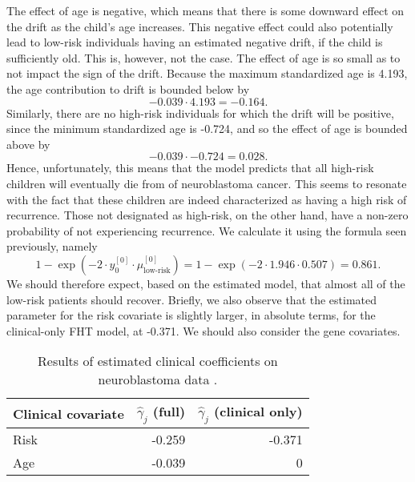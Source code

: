The effect of age is negative, which means that there is some downward effect on the drift as the child's age increases.
This negative effect could also potentially lead to low-risk individuals having an estimated negative drift, if the child is sufficiently old.
This is, however, not the case.
The effect of age is so small as to not impact the sign of the drift.
Because the maximum standardized age is 4.193, the age contribution to drift is bounded below by 
\begin{equation*}
    -0.039\cdot4.193=-0.164.
\end{equation*}
Similarly, there are no high-risk individuals for which the drift will be positive, since the minimum standardized age is -0.724, and so the effect of age is bounded above by
\begin{equation*}
    -0.039\cdot-0.724=0.028.
\end{equation*}
Hence, unfortunately, this means that the model predicts that all high-risk children will eventually die from of neuroblastoma cancer.
This seems to resonate with the fact that these children are indeed characterized as having a high risk of recurrence.
Those not designated as high-risk, on the other hand, have a non-zero probability of not experiencing recurrence.
We calculate it using the formula seen previously, namely
\begin{equation*}
    1-\exp{(-2\cdot y_{0}^{[0]}\cdot\mu_{\text{low-risk}}^{[0]})}=1-\exp{(-2\cdot 1.946\cdot 0.507)}=0.861.
\end{equation*}
We should therefore expect, based on the estimated model, that almost all of the low-risk patients should recover.
Briefly, we also observe that the estimated parameter for the risk covariate is slightly larger, in absolute terms, for the clinical-only FHT model, at -0.371.
We should also consider the gene covariates.
\begin{table}
\caption{Results of estimated clinical coefficients on neuroblastoma data \citep{oberthuer-data}.}
\label{tab:oberthuer-gamma}
\centering
\begin{tabular}{lrr}
\toprule
Clinical covariate & $\hat{\gamma}_j$ (full) & $\hat{\gamma}_j$ (clinical only)\\
\hline
Risk      &  -0.259  &  -0.371 \\
Age       &  -0.039  &       0 \\
\bottomrule
\end{tabular}
\end{table}

